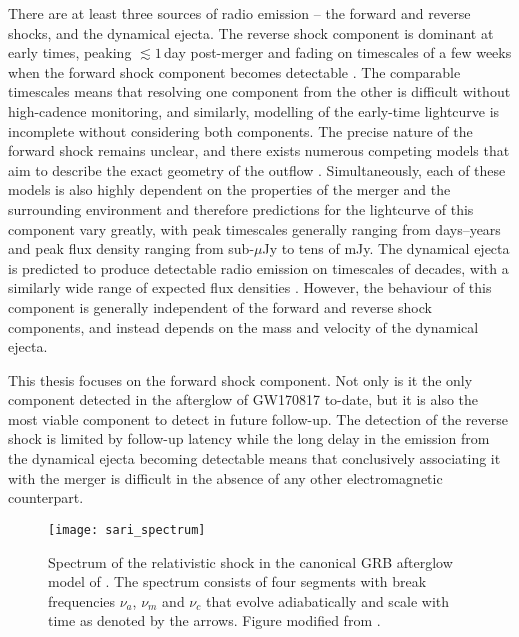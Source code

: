 There are at least three sources of radio emission -- the forward and reverse shocks, and the dynamical ejecta. The reverse shock component is dominant at early times, peaking $\lesssim 1\,$day post-merger and fading on timescales of a few weeks when the forward shock component becomes detectable \citep[e.g.][]{1995ApJ...455L.143S,2016ApJ...825...48R,2019MNRAS.489.1820L}. The comparable timescales means that resolving one component from the other is difficult without high-cadence monitoring, and similarly, modelling of the early-time lightcurve is incomplete without considering both components. The precise nature of the forward shock remains unclear, and there exists numerous competing models that aim to describe the exact geometry of the outflow \citep[e.g.][]{1998ApJ...497L..17S,2002ApJ...568..820G,2004MNRAS.350..213P,2013ApJ...776L...9D,2015MNRAS.450.3549S,2019MNRAS.484L..98K,2020arXiv200602466G}. Simultaneously, each of these models is also highly dependent on the properties of the merger and the surrounding environment and therefore predictions for the lightcurve of this component vary greatly, with peak timescales generally ranging from days--years and peak flux density ranging from sub-$\mu$Jy to tens of mJy. The dynamical ejecta is predicted to produce detectable radio emission on timescales of decades, with a similarly wide range of expected flux densities \citep[e.g.]{2011Natur.478...82N,2013MNRAS.430.2121P,2015MNRAS.450.1430H,2015MNRAS.452.3419M,2017CQGra..34j5014D,2018ApJ...869L..35R}. However, the behaviour of this component is generally independent of the forward and reverse shock components, and instead depends on the mass and velocity of the dynamical ejecta.

This thesis focuses on the forward shock component. Not only is it the only component detected in the afterglow of GW170817 to-date, but it is also the most viable component to detect in future follow-up. The detection of the reverse shock is limited by follow-up latency while the long delay in the emission from the dynamical ejecta becoming detectable means that conclusively associating it with the merger is difficult in the absence of any other electromagnetic counterpart.

\begin{figure}
    \centering
    \texttt{[image: sari\_spectrum]}
    \caption[Spectral energy distribution of a relativistic shock]{Spectrum of the relativistic shock in the canonical GRB afterglow model of \citet{2002ApJ...568..820G}. The spectrum consists of four segments with break frequencies $\nu_a$, $\nu_m$ and $\nu_c$ that evolve adiabatically and scale with time as denoted by the arrows. Figure modified from \citep{1998ApJ...497L..17S}.}
    \label{fig:sari_spectrum}
\end{figure}

